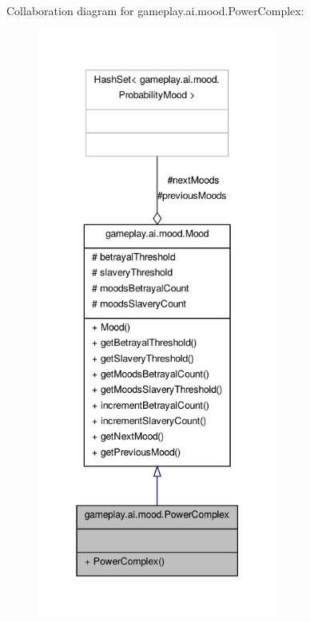 Collaboration diagram for gameplay.\-ai.\-mood.\-Power\-Complex\-:
\nopagebreak
\begin{figure}[H]
\begin{center}
\leavevmode
\includegraphics[height=550pt]{a00116}
\end{center}
\end{figure}
